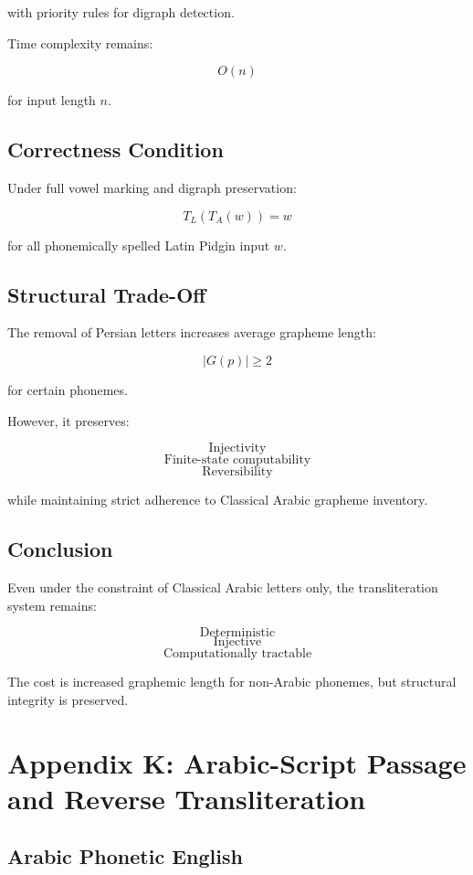 \documentclass[12pt]{article}
\begin{document}
with priority rules for digraph detection.

Time complexity remains:

\[
O(n)
\]

for input length \( n \).

\subsection{Correctness Condition}

Under full vowel marking and digraph preservation:

\[
T_L(T_A(w)) = w
\]

for all phonemically spelled Latin Pidgin input \( w \).

\subsection{Structural Trade-Off}

The removal of Persian letters increases average grapheme length:

\[
|G(p)| \ge 2
\]

for certain phonemes.

However, it preserves:

\[
\text{Injectivity}
\]
\[
\text{Finite-state computability}
\]
\[
\text{Reversibility}
\]

while maintaining strict adherence to Classical Arabic grapheme inventory.

\subsection{Conclusion}

Even under the constraint of Classical Arabic letters only, the transliteration system remains:

\[
\text{Deterministic}
\]
\[
\text{Injective}
\]
\[
\text{Computationally tractable}
\]

The cost is increased graphemic length for non-Arabic phonemes, but structural integrity is preserved.

\section{Appendix K: Arabic-Script Passage and Reverse Transliteration}

\subsection{Arabic Phonetic English}
\end{document}
